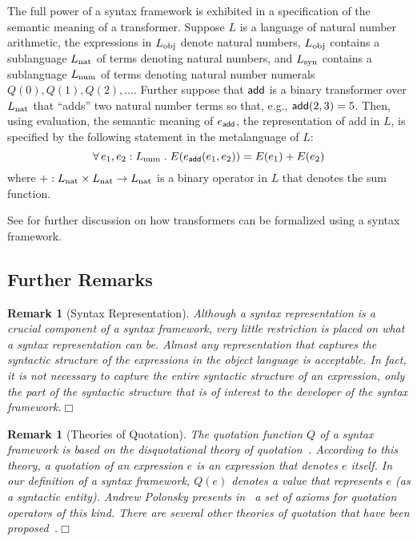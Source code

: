 \documentclass[11pt,fleqn]{article}
\newcommand{\mname}[1]{\mbox{\sf #1}}
\newcommand{\mcolon}{\mathrel:}
\newcommand{\mdot}{\mathrel.}
\newcommand{\tarrow}{\rightarrow}
\newcommand{\ForallApp}{\forall\,}
\newtheorem{rem}[thm]{Remark}
\begin{document}
The full power of a syntax framework is exhibited in a specification
of the semantic meaning of a transformer.  Suppose $L$ is a language
of natural number arithmetic, the expressions in $L_{\rm obj}$ denote
natural numbers, $L_{\rm obj}$ contains a sublanguage $L_{\rm nat}$ of
terms denoting natural numbers, and $L_{\rm syn}$ contains a
sublanguage $L_{\rm num}$ of terms denoting natural number numerals
$Q(0),Q(1),Q(2),\ldots$.  Further suppose that $\mname{add}$ is a
binary transformer over $L_{\rm nat}$ that ``adds'' two natural number
terms so that, e.g., $\mname{add}(2,3) = 5$.  Then, using evaluation,
the semantic meaning of $e_{\sf add}$, the representation of
\mname{add} in $L$, is specified by the following statement in the
metalanguage of $L$:
\[\ForallApp e_1,e_2 \mcolon L_{\rm num} \mdot E(e_{\sf add}(e_1,e_2)) = 
E(e_1) + E(e_2)\] where $+ : L_{\rm nat} \times L_{\rm nat} \tarrow
L_{\rm nat}$ is a binary operator in $L$ that denotes the sum
function.

See \cite{Farmer13} for further discussion on how transformers can be
formalized using a syntax framework.

\subsection{Further Remarks}

\begin{rem}[Syntax Representation]\em
Although a syntax representation is a crucial component of a syntax
framework, very little restriction is placed on what a syntax
representation can be.  Almost any representation that captures the
syntactic structure of the expressions in the object language is
acceptable.  In fact, it is not necessary to capture the entire
syntactic structure of an expression, only the part of the syntactic
structure that is of interest to the developer of the syntax
framework.\hfill $\Box$
\end{rem}

\begin{rem}[Theories of Quotation]\em
The quotation function $Q$ of a syntax framework is based on the
\emph{disquotational theory of quotation}~\cite{Quotation12}.
According to this theory, a quotation of an expression $e$ is an
expression that denotes $e$ itself.  In our definition of a syntax
framework, $Q(e)$ denotes a value that represents $e$ (as a syntactic
entity).  Andrew Polonsky presents in~\cite{Polonsky11} a set of
axioms for quotation operators of this kind.  There are several other
theories of quotation that have been
proposed~\cite{Quotation12}.\hfill $\Box$
\end{rem}
\end{document}
